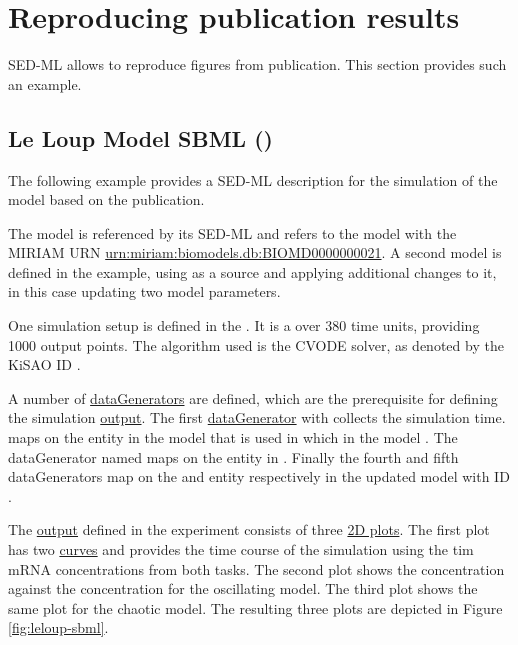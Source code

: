\section{Reproducing publication results}
SED-ML allows to reproduce figures from publication. This section provides such an example.

\subsection{Le Loup Model SBML ()}
\label{example:leloup_sbml}
The following example provides a SED-ML description for the simulation of the model based on the publication\cite{LeLoup1999}.

The model is referenced by its SED-ML \hyperref[sec:id]{}  and refers to the model with the MIRIAM URN \url{urn:miriam:biomodels.db:BIOMD0000000021}. A second model is defined in the example, using  as a source and applying additional changes to it, in this case updating two model parameters.

One simulation setup is defined in the . It is a  over 380 time units, providing 1000 output points. The algorithm used is the CVODE solver, as denoted by the KiSAO ID .

A number of \hyperref[class:dataGenerator]{dataGenerators} are defined, which are the prerequisite for defining the simulation \hyperref[class:output]{output}. The first \hyperref[class:dataGenerator]{dataGenerator} with \hyperref[sec:id]{}  collects the simulation time.  maps on the  entity in the model that is used in  which in the model . The dataGenerator named  maps on the  entity in . Finally  the fourth and fifth dataGenerators map on the  and  entity respectively in the updated model with ID .

The \hyperref[class:output]{output} defined in the experiment consists of three \hyperref[class:plot2D]{2D plots}. The first plot has two \hyperref[class:curve]{curves} and provides the time course of the simulation using the tim mRNA concentrations from both tasks. The second plot shows the  concentration against the  concentration for the oscillating model. The third plot shows the same plot for the chaotic model. The resulting three plots are depicted in Figure \ref{fig:leloup-sbml}. 

